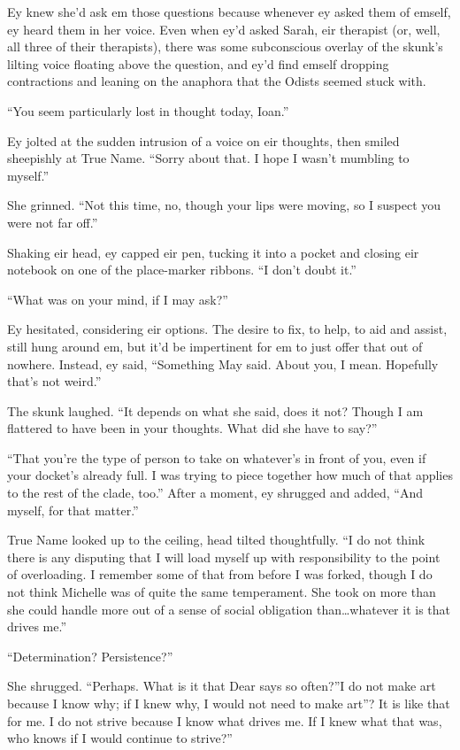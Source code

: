 Ey knew she'd ask em those questions because whenever ey asked them of emself, ey heard them in her voice. Even when ey'd asked Sarah, eir therapist (or, well, all three of their therapists), there was some subconscious overlay of the skunk's lilting voice floating above the question, and ey'd find emself dropping contractions and leaning on the anaphora that the Odists seemed stuck with.

``You seem particularly lost in thought today, Ioan.''

Ey jolted at the sudden intrusion of a voice on eir thoughts, then smiled sheepishly at True Name. ``Sorry about that. I hope I wasn't mumbling to myself.''

She grinned. ``Not this time, no, though your lips were moving, so I suspect you were not far off.''

Shaking eir head, ey capped eir pen, tucking it into a pocket and closing eir notebook on one of the place-marker ribbons. ``I don't doubt it.''

``What was on your mind, if I may ask?''

Ey hesitated, considering eir options. The desire to fix, to help, to aid and assist, still hung around em, but it'd be impertinent for em to just offer that out of nowhere. Instead, ey said, ``Something May said. About you, I mean. Hopefully that's not weird.''

The skunk laughed. ``It depends on what she said, does it not? Though I am flattered to have been in your thoughts. What did she have to say?''

``That you're the type of person to take on whatever's in front of you, even if your docket's already full. I was trying to piece together how much of that applies to the rest of the clade, too.'' After a moment, ey shrugged and added, ``And myself, for that matter.''

True Name looked up to the ceiling, head tilted thoughtfully. ``I do not think there is any disputing that I will load myself up with responsibility to the point of overloading. I remember some of that from before I was forked, though I do not think Michelle was of quite the same temperament. She took on more than she could handle more out of a sense of social obligation than\ldots whatever it is that drives me.''

``Determination? Persistence?''

She shrugged. ``Perhaps. What is it that Dear says so often?''I do not make art because I know why; if I knew why, I would not need to make art''? It is like that for me. I do not strive because I know what drives me. If I knew what that was, who knows if I would continue to strive?''

